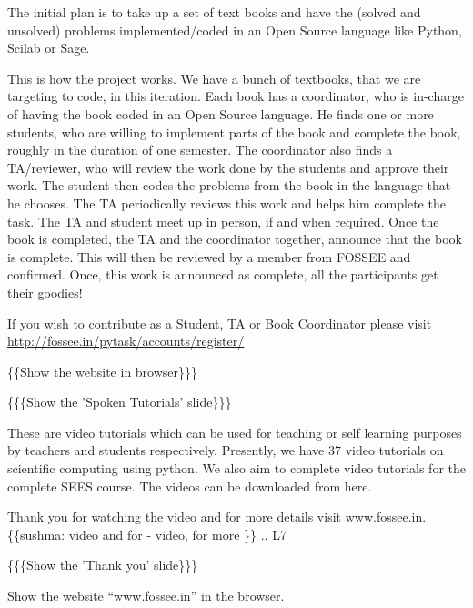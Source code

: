 \documentclass[a4paper,english]{article}
\begin{document}
The initial plan is to take up a set of text books and have the (solved and unsolved) problems implemented/coded in an Open Source language like Python, Scilab or Sage.

This is how the project works. We have a bunch of textbooks, that we are targeting to code, in this iteration. Each book has a coordinator, who is in-charge of having the book coded in an Open Source language. He finds one or more students, who are willing to implement parts of the book and complete the book, roughly in the duration of one semester. The coordinator also finds a TA/reviewer, who will review the work done by the students and approve their work. The student then codes the problems from the book in the language that he chooses. The TA periodically reviews this work and helps him complete the task. The TA and student meet up in person, if and when required. Once the book is completed, the TA and the coordinator together, announce that the book is complete. This will then be reviewed by a member from FOSSEE and confirmed. Once, this work is announced as complete, all the participants get their goodies!

If you wish to contribute as a Student, TA or Book Coordinator please visit \url{http://fossee.in/pytask/accounts/register/}


\{\{Show the website in browser\}\}\}

\{\{\{Show the 'Spoken Tutorials' slide\}\}\}


These are video tutorials which can be used for teaching or self learning purposes by teachers and students respectively. Presently, we have 37 video tutorials on scientific computing using python. We also aim to complete video tutorials for the complete SEES course. The videos can be downloaded from here.

Thank you for watching the video and for more details visit www.fossee.in.
\{\{sushma: video and for - video, for more \}\}
.. L7

\{\{\{Show the 'Thank you' slide\}\}\}

Show the website ``www.fossee.in'' in the browser.
\end{document}
